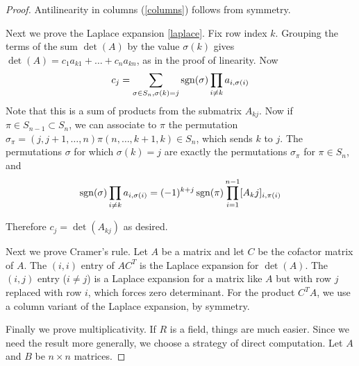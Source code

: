 \begin{proof}
	Antilinearity in columns (\ref{columns}) follows from symmetry.
	
	Next we prove the Laplace expansion \ref{laplace}.  Fix row index $k$.  Grouping the terms of the 
	sum $\det(A)$ by the value $\sigma(k)$ gives $\det(A) = c_1a_{k1} + \ldots + c_na_{kn}$, as in the proof
	of linearity.  Now 
	$$c_j = \sum_{\sigma \in S_n, \sigma(k)=j} \operatorname{sgn}(\sigma) \prod_{i \neq k} a_{i,\sigma(i)}$$
	Note that this is a sum of products from the submatrix $A_{kj}$.  Now if $\pi \in S_{n-1} \subset S_n$, we can 
	associate to $\pi$ the permutation $\sigma_\pi = (j,j+1,\ldots,n)\pi(n,\ldots,k+1,k) \in S_n$, which sends $k$ to $j$.
	The permutations $\sigma$ for which $\sigma(k)=j$ are exactly the permutations $\sigma_\pi$ for $\pi \in S_n$,
	and 
	$$\operatorname{sgn}(\sigma) \prod_{i \neq k} a_{i,\sigma(i)} = (-1)^{k+j}\operatorname{sgn}(\pi) \prod_{i=1}^{n-1} [A_kj]_{i, \pi(i)}$$
	
	Therefore $c_j = \det(A_{kj})$ as desired.
	
	
	Next we prove Cramer's rule.  
	Let $A$ be a matrix and let $C$ be the cofactor matrix of $A$.  The $(i,i)$ entry of $AC^T$ is the Laplace
	expansion for $\det(A)$.  The $(i,j)$ entry ($i \neq j$) is a Laplace expansion for a matrix like $A$ but 
	with row $j$ replaced with row $i$, which forces zero determinant.  For the product $C^TA$, we use a 
	column variant of the Laplace expansion, by symmetry.
		
	Finally we prove multiplicativity.  If $R$ is a field, things are much easier.  Since we need the result more 
	generally, we choose a strategy of direct computation.  Let $A$ and $B$ be $n \times n$ matrices. 
	\newpage
	

\end{proof}
